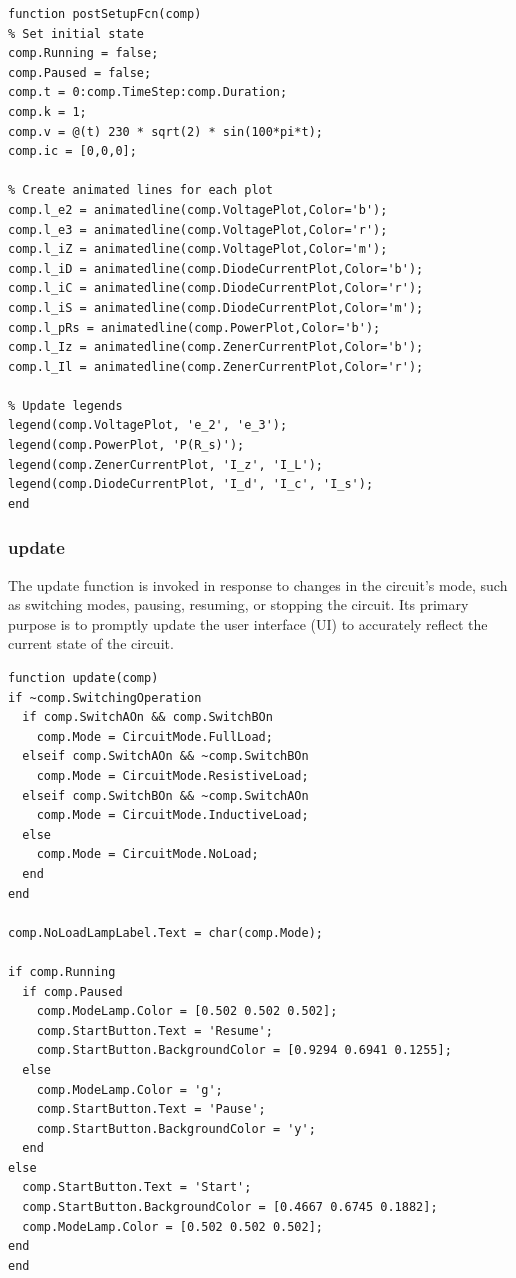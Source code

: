 \begin{lstlisting}[caption=MATLAB code for the function called imeddiately after the UI is initialised]
function postSetupFcn(comp)
% Set initial state
comp.Running = false; 
comp.Paused = false;
comp.t = 0:comp.TimeStep:comp.Duration;
comp.k = 1;
comp.v = @(t) 230 * sqrt(2) * sin(100*pi*t);
comp.ic = [0,0,0];

% Create animated lines for each plot
comp.l_e2 = animatedline(comp.VoltagePlot,Color='b');
comp.l_e3 = animatedline(comp.VoltagePlot,Color='r');
comp.l_iZ = animatedline(comp.VoltagePlot,Color='m');
comp.l_iD = animatedline(comp.DiodeCurrentPlot,Color='b');
comp.l_iC = animatedline(comp.DiodeCurrentPlot,Color='r');
comp.l_iS = animatedline(comp.DiodeCurrentPlot,Color='m');
comp.l_pRs = animatedline(comp.PowerPlot,Color='b');
comp.l_Iz = animatedline(comp.ZenerCurrentPlot,Color='b');
comp.l_Il = animatedline(comp.ZenerCurrentPlot,Color='r');

% Update legends
legend(comp.VoltagePlot, 'e_2', 'e_3');
legend(comp.PowerPlot, 'P(R_s)');
legend(comp.ZenerCurrentPlot, 'I_z', 'I_L');
legend(comp.DiodeCurrentPlot, 'I_d', 'I_c', 'I_s');
end
\end{lstlisting}

\subsubsection{update}
The update function is invoked in response to changes in the circuit's mode, such as switching modes, pausing, resuming, or stopping the circuit. Its primary purpose is to promptly update the user interface (UI) to accurately reflect the current state of the circuit.
\begin{lstlisting}[caption=MATLAB code used to update the UI after a property is changed]
function update(comp)
if ~comp.SwitchingOperation
  if comp.SwitchAOn && comp.SwitchBOn
    comp.Mode = CircuitMode.FullLoad;
  elseif comp.SwitchAOn && ~comp.SwitchBOn
    comp.Mode = CircuitMode.ResistiveLoad;
  elseif comp.SwitchBOn && ~comp.SwitchAOn
    comp.Mode = CircuitMode.InductiveLoad;
  else
    comp.Mode = CircuitMode.NoLoad;
  end
end

comp.NoLoadLampLabel.Text = char(comp.Mode);

if comp.Running
  if comp.Paused
    comp.ModeLamp.Color = [0.502 0.502 0.502];
    comp.StartButton.Text = 'Resume';
    comp.StartButton.BackgroundColor = [0.9294 0.6941 0.1255];
  else
    comp.ModeLamp.Color = 'g';
    comp.StartButton.Text = 'Pause';
    comp.StartButton.BackgroundColor = 'y';
  end
else
  comp.StartButton.Text = 'Start';
  comp.StartButton.BackgroundColor = [0.4667 0.6745 0.1882];
  comp.ModeLamp.Color = [0.502 0.502 0.502];
end
end
\end{lstlisting}

